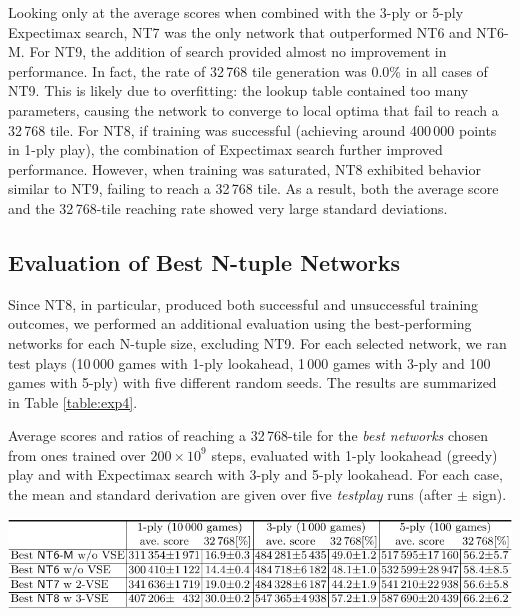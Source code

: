 Looking only at the average scores when combined with the 3-ply or 5-ply Expectimax search, \textsf{NT7} was the only network that outperformed \textsf{NT6} and \textsf{NT6-M}.
For \textsf{NT9}, the addition of search provided almost no improvement in performance. In fact, the rate of 32\,768 tile generation was 0.0\% in all cases of \textsf{NT9}. This is likely due to overfitting: the lookup table contained too many parameters, causing the network to converge to local optima that fail to reach a 32\,768 tile.
For \textsf{NT8}, if training was successful (achieving around 400\,000 points in 1-ply play), the combination of Expectimax search further improved performance. However, when training was saturated, \textsf{NT8} exhibited behavior similar to \textsf{NT9}, failing to reach a 32\,768 tile. As a result, both the average score and the 32\,768-tile reaching rate showed very large standard deviations.

\subsection{Evaluation of Best N-tuple Networks}



Since \textsf{NT8}, in particular, produced both successful and unsuccessful training outcomes, we performed an additional evaluation using the best-performing networks for each N-tuple size, excluding \textsf{NT9}.
For each selected network, we ran test plays (10\,000 games with 1-ply lookahead, 1\,000 games with 3-ply and 100 games with 5-ply) with five different random seeds.
The results are summarized in Table \ref{table:exp4}.

\begin{table}
 \caption{Average scores and ratios of reaching a 32\,768-tile for the \emph{best networks} chosen from ones trained over $200\times 10^9$ steps, evaluated with 1-ply lookahead (greedy) play and with Expectimax search with 3-ply and 5-ply lookahead. For each case, the mean and standard derivation are given over five \emph{testplay} runs (after $\pm$ sign).}
 \label{table:exp4}
 \centering\includegraphics[width=.99\linewidth]{figures/table-exp4.pdf}
\end{table}

